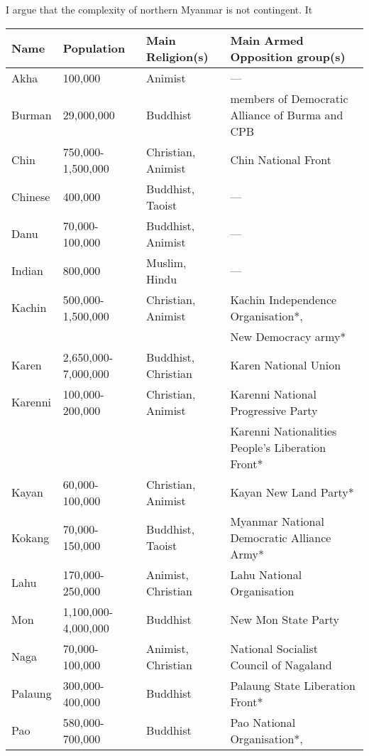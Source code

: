 \documentclass{article}
\begin{document}
I argue that the complexity of northern Myanmar is not contingent. It 

\begin{table}[htbp]
\centering

\begin{tabular}{@{}lllp{5.5cm}@{}}

\toprule
Name    & Population          & Main Religion(s)   & Main Armed Opposition group(s) \\
\midrule
Akha    & 100,000             & Animist            & --- \\
Burman  & 29,000,000          & Buddhist           & members of Democratic Alliance of Burma and CPB \\
Chin    & 750,000-1,500,000   & Christian, Animist & Chin National Front \\
Chinese & 400,000             & Buddhist, Taoist   & --- \\
Danu    & 70,000-100,000      & Buddhist, Animist  & --- \\
Indian  & 800,000             & Muslim, Hindu      & --- \\
Kachin  & 500,000-1,500,000   & Christian, Animist & Kachin Independence Organisation*, \\
        &                     &                    & New Democracy army* \\
Karen   & 2,650,000-7,000,000 & Buddhist, Christian & Karen National Union \\
Karenni & 100,000-200,000     & Christian, Animist & Karenni National Progressive Party \\
        &                     &                    & Karenni Nationalities People's Liberation Front* \\
Kayan   & 60,000-100,000      & Christian, Animist & Kayan New Land Party* \\
Kokang  & 70,000-150,000      & Buddhist, Taoist   & Myanmar National Democratic Alliance Army* \\
Lahu    & 170,000-250,000     & Animist, Christian & Lahu National Organisation \\
Mon     & 1,100,000-4,000,000 & Buddhist           & New Mon State Party \\
Naga    & 70,000-100,000      & Animist, Christian & National Socialist Council of Nagaland \\
Palaung & 300,000-400,000     & Buddhist           & Palaung State Liberation Front* \\
Pao     & 580,000-700,000     & Buddhist           & Pao National Organisation*, \\

\end{tabular}
\end{table}
\end{document}
